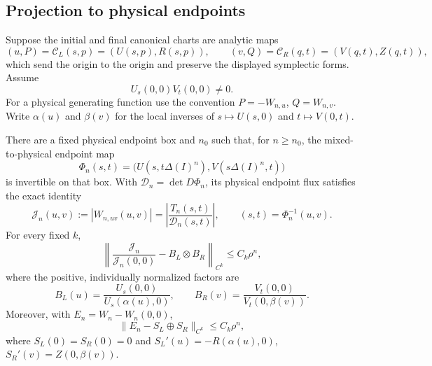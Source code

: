 \subsection{Projection to physical endpoints}
Suppose the initial and final canonical charts are analytic maps
\[
 (u,P)=\mathcal C_L(s,p)=(U(s,p),R(s,p)),\qquad
 (v,Q)=\mathcal C_R(q,t)=(V(q,t),Z(q,t)),
\]
which send the origin to the origin and preserve the displayed
symplectic forms. Assume
\begin{equation}\label{eq:v14-transversality}
                 U_s(0,0)V_t(0,0)\ne0.
\end{equation}
For a physical generating function use the convention
$P=-W_{n,u}$, $Q=W_{n,v}$. Write $\alpha(u)$ and $\beta(v)$ for
the local inverses of $s\mapsto U(s,0)$ and $t\mapsto V(0,t)$.

\begin{proposition}
\label{prop:v14-physical-normal-form}
There are a fixed physical endpoint box and $n_0$ such that, for
$n\ge n_0$, the mixed-to-physical endpoint map
\begin{equation}\label{eq:v14-endpoint-map}
 \Phi_n(s,t)=\bigl(U(s,t\Delta(I)^n),V(s\Delta(I)^n,t)\bigr)
\end{equation}
is invertible on that box. With $\mathcal D_n=\det D\Phi_n$, its
physical endpoint flux satisfies the exact identity
\begin{equation}\label{eq:v14-physical-jacobian}
 \mathcal J_n(u,v):=|W_{n,uv}(u,v)|
     =\left|\frac{T_n(s,t)}{\mathcal D_n(s,t)}\right|,
                 \qquad (s,t)=\Phi_n^{-1}(u,v).
\end{equation}
For every fixed $k$,
\begin{equation}\label{eq:v14-projected-limit}
 \left\|\frac{\mathcal J_n}{\mathcal J_n(0,0)}
                         -B_L\otimes B_R\right\|_{C^k}
                       \le C_k\rho^n,
\end{equation}
where the positive, individually normalized factors are
\begin{equation}\label{eq:v14-projection-amplitudes}
 B_L(u)=\frac{U_s(0,0)}{U_s(\alpha(u),0)},\qquad
 B_R(v)=\frac{V_t(0,0)}{V_t(0,\beta(v))}.
\end{equation}
Moreover, with $E_n=W_n-W_n(0,0)$,
\begin{equation}\label{eq:v14-action-limit}
 \|E_n-S_L\oplus S_R\|_{C^k}\le C_k\rho^n,
\end{equation}
where $S_L(0)=S_R(0)=0$ and
$S_L'(u)=-R(\alpha(u),0)$, $S_R'(v)=Z(0,\beta(v))$.
\end{proposition}
